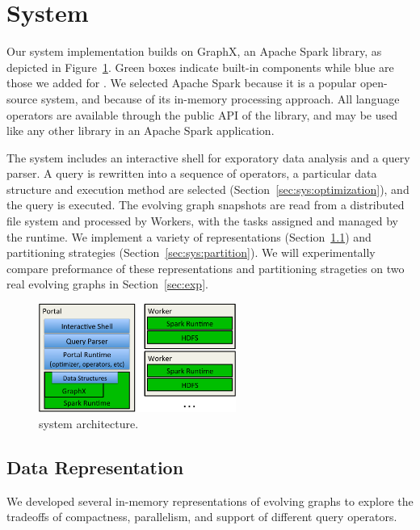 \section{System}
\label{sec:sys}

Our \ql system implementation builds on GraphX, an Apache Spark
library, as depicted in Figure~\ref{fig:arch}.  Green boxes indicate
built-in components while blue are those we added for \ql.  We
selected Apache Spark because it is a popular open-source system, and
because of its in-memory processing approach.  All language operators
are available through the public API of the \ql library, and may be
used like any other library in an Apache Spark application.

The \ql system includes an interactive shell for exporatory data
analysis and a query parser.  A \ql query is rewritten into a sequence
of operators, a particular data structure and execution method are
selected (Section~\ref{sec:sys:optimization}), and the query is
executed.  The evolving graph snapshots are read from a distributed
file system and processed by Workers, with the tasks assigned and
managed by the runtime.  We implement a variety of \tg representations
(Section~\ref{sec:sys:datastructs}) and partitioning strategies
(Section~\ref{sec:sys:partition}).  We will experimentally compare
preformance of these representations and partitioning strageties on
two real evolving graphs in Section~\ref{sec:exp}.

\begin{figure}[t!]
\begin{center}
\includegraphics[height=1.4in]{figs/architecture.pdf}
\caption{\ql system architecture.}
\label{fig:arch}
\end{center}
\vspace{-0.5cm}
\end{figure}

\subsection{Data Representation}
\label{sec:sys:datastructs}

We developed several in-memory representations of evolving graphs to
explore the tradeoffs of compactness, parallelism, and support of
different query operators. 

